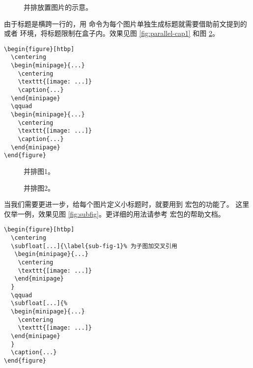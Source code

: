 \begin{figure}[htp]
  \centering
  \qquad
  \par\bigskip
  \caption{并排放置图片的示意。}\label{fig:parallel-fig}
\end{figure}

由于标题是横跨一行的，用  命令为每个图片单独生成标题就需要借助前文提到的 
或者  环境，将标题限制在盒子内。效果见图 \ref{fig:parallel-cap1} 和图 \ref{fig:parallel-cap2}。
\begin{verbatim}
\begin{figure}[htbp]
  \centering
  \begin{minipage}{...}
    \centering
    \texttt{[image: ...]}
    \caption{...}
  \end{minipage}
  \qquad
  \begin{minipage}{...}
    \centering
    \texttt{[image: ...]}
    \caption{...}
  \end{minipage}
\end{figure}
\end{verbatim}

\begin{figure}[htp]
  \centering
  \begin{minipage}{12em}
    \centering
    \caption{并排图1。}\label{fig:parallel-cap1}
  \end{minipage}
  \qquad
  \begin{minipage}{12em}
    \centering
    \caption{并排图2。}\label{fig:parallel-cap2}
  \end{minipage}
\end{figure}

当我们需要更进一步，给每个图片定义小标题时，就要用到  宏包的功能了。
这里仅举一例，效果见图 \ref{fig:subfig}。更详细的用法请参考  宏包的帮助文档。
\begin{verbatim}
\begin{figure}[htbp]
  \centering
  \subfloat[...]{\label{sub-fig-1}% 为子图加交叉引用
   \begin{minipage}{...}
    \centering
    \texttt{[image: ...]}
   \end{minipage}
  }
  \qquad
  \subfloat[...]{%
  \begin{minipage}{...}
    \centering
    \texttt{[image: ...]}
  \end{minipage}
  }
  \caption{...}
\end{figure}
\end{verbatim}

